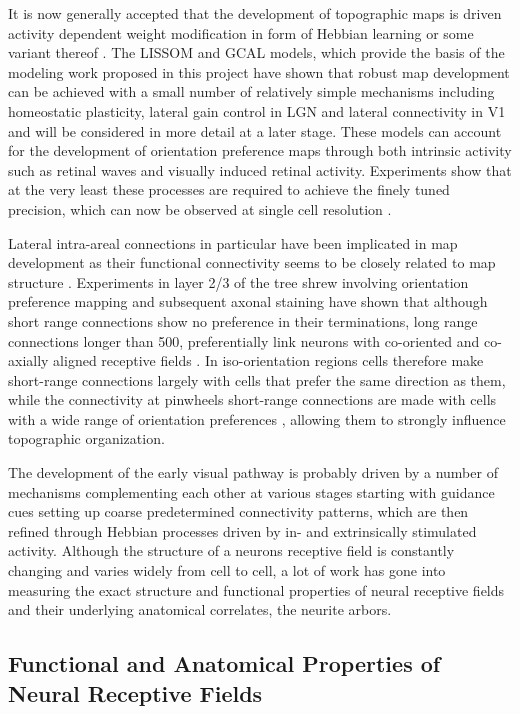 It is now generally accepted that the development of topographic maps
is driven activity dependent weight modification in form of Hebbian
learning or some variant thereof \citep{Wolf}. The LISSOM and
GCAL models, which provide the basis of the modeling work proposed in
this project have shown that robust map development can be achieved
with a small number of relatively simple mechanisms including
homeostatic plasticity, lateral gain control in LGN and lateral
connectivity in V1 \citep{Stevens2013} and will be considered in more
detail at a later stage. These models can account for the development
of orientation preference maps through both intrinsic activity such as
retinal waves \citep{Bednar2003} and visually induced retinal
activity. Experiments show that at the very least these processes are
required to achieve the ﬁnely tuned precision, which can now be
observed at single cell resolution \citep{Ohki2005,White2007}.

Lateral intra-areal connections in particular have been implicated in
map development as their functional connectivity seems to be closely
related to map structure \citep{Gilbert1983}. Experiments in layer 2/3
of the tree shrew involving orientation preference mapping and
subsequent axonal staining have shown that although short range
connections show no preference in their terminations, long range
connections longer than \unit{500}{\micro\meter}, preferentially link
neurons with co-oriented and co-axially aligned receptive fields
\citep{Bosking1997}. In iso-orientation regions cells therefore make
short-range connections largely with cells that prefer the same
direction as them, while the connectivity at pinwheels short-range
connections are made with cells with a wide range of orientation
preferences \citep{Ohki2006a}, allowing them to strongly influence
topographic organization.

The development of the early visual pathway is probably driven by a
number of mechanisms complementing each other at various stages
starting with guidance cues setting up coarse predetermined
connectivity patterns, which are then refined through Hebbian
processes driven by in- and extrinsically stimulated
activity. Although the structure of a neurons receptive field is
constantly changing and varies widely from cell to cell, a lot of work
has gone into measuring the exact structure and functional properties
of neural receptive fields and their underlying anatomical correlates,
the neurite arbors.

\subsection{Functional and Anatomical Properties of Neural Receptive Fields}

